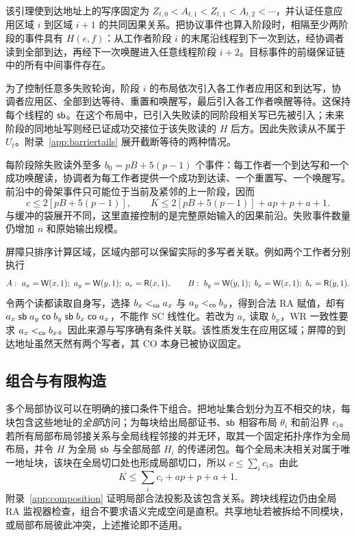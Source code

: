 该引理使到达地址上的写序固定为 $Z_{t,0}<A_{t,1}<Z_{t,1}<A_{t,2}<\cdots$，并认证任意应用区域 $i$ 到区域 $i+1$ 的共同因果关系。把协议事件也算入阶段时，相隔至少两阶段的事件具有 $H(e,f)$：从工作者阶段 $i$ 的末尾沿线程到下一次到达，经协调者读到全部到达，再经下一次唤醒进入任意线程阶段 $i+2$。目标事件的前缀保证链中的所有中间事件存在。

为了控制任意多失败轮询，阶段 $i$ 的布局依次引入各工作者应用区和到达写，协调者应用区、全部到达等待、重置和唤醒写，最后引入各工作者唤醒等待。这保持每个线程的 $\mathsf{sb}$。在这个布局中，已引入失败读的同阶段相关写已先被引入；未来阶段的同地址写则经已证成功交接位于该失败读的 $H$ 后方。因此失败读从不属于 $U_t$。附录~\ref{app:barriertails} 展开截断等待的两种情况。

每阶段除失败读外至多 $b_0=pB+5(p-1)$ 个事件：每工作者一个到达写和一个成功唤醒读，协调者为每工作者提供一个成功到达读、一个重置写、一个唤醒写。前沿中的骨架事件只可能位于当前及紧邻的上一阶段，因而
\begin{equation}\label{eq:barrierbound}
 c\le 2[pB+5(p-1)],\qquad
 K\le 2[pB+5(p-1)]+ap+p+a+1.
\end{equation}
与缓冲的袋展开不同，这里直接控制的是完整原始输入的因果前沿。失败事件数量仍增加 $n$ 和原始输出规模。

屏障只排序计算区域，区域内部可以保留实际的多写者关联。例如两个工作者分别执行
\[
 A:\ a_x=\W(x,1);\ a_y=\W(y,1);\ a_r=\R(x,1),\qquad
 B:\ b_y=\W(y,1);\ b_x=\W(x,1);\ b_r=\R(y,1).
\]
令两个读都读取自身写，选择 $b_x<_{\mathsf{co}}a_x$ 与 $a_y<_{\mathsf{co}}b_y$，得到合法 RA 赋值，却有 $a_x\mathrel{\mathsf{sb}}a_y\mathrel{\mathsf{co}}b_y\mathrel{\mathsf{sb}}b_x\mathrel{\mathsf{co}}a_x$，不能作 SC 线性化。若改为 $a_r$ 读取 $b_x$，WR 一致性要求 $a_x<_{\mathsf{co}}b_x$。因此来源与写序确有条件关联。该性质发生在应用区域；屏障的到达地址虽然天然有两个写者，其 CO 本身已被协议固定。

\subsection{组合与有限构造}\label{sec:construct}
多个局部协议可以在明确的接口条件下组合。把地址集合划分为互不相交的块，每块包含这些地址的\emph{全部}访问；为每块给出局部证书、$\mathsf{sb}$ 相容布局 $\theta_i$ 和前沿界 $c_i$。若所有局部布局邻接关系与全局线程邻接的并无环，取其一个固定拓扑序作为全局布局，并令 $H$ 为全局 $\mathsf{sb}$ 与全部局部 $H_i$ 的传递闭包。每个全局未决相关对属于唯一地址块，该块在全局切口处也形成局部切口，所以 $c\le\sum_i c_i$。由此
\[
 K\le\sum_i c_i+ap+p+a+1.
\]
附录~\ref{app:composition} 证明局部合法投影及该包含关系。跨块线程边仍由全局 RA 监视器检查，组合不要求语义完成空间是直积。共享地址若被拆给不同模块，或局部布局彼此冲突，上述推论即不适用。

